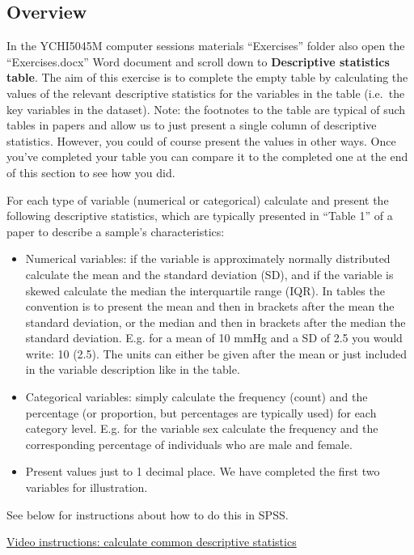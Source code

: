\documentclass[
]{book}
\begin{document}
\hypertarget{overview-9}{%
\subsection{Overview}\label{overview-9}}

In the YCHI5045M computer sessions materials ``Exercises'' folder also open the ``Exercises.docx'' Word document and scroll down to \textbf{Descriptive statistics table}. The aim of this exercise is to complete the empty table by calculating the values of the relevant descriptive statistics for the variables in the table (i.e.~the key variables in the dataset). Note: the footnotes to the table are typical of such tables in papers and allow us to just present a single column of descriptive statistics. However, you could of course present the values in other ways. Once you've completed your table you can compare it to the completed one at the end of this section to see how you did.

For each type of variable (numerical or categorical) calculate and present the following descriptive statistics, which are typically presented in ``Table 1'' of a paper to describe a sample's characteristics:

\begin{itemize}
\item
  Numerical variables: if the variable is approximately normally distributed calculate the mean and the standard deviation (SD), and if the variable is skewed calculate the median the interquartile range (IQR). In tables the convention is to present the mean and then in brackets after the mean the standard deviation, or the median and then in brackets after the median the standard deviation. E.g. for a mean of 10 mmHg and a SD of 2.5 you would write: 10 (2.5). The units can either be given after the mean or just included in the variable description like in the table.
\item
  Categorical variables: simply calculate the frequency (count) and the percentage (or proportion, but percentages are typically used) for each category level. E.g. for the variable sex calculate the frequency and the corresponding percentage of individuals who are male and female.
\item
  Present values just to 1 decimal place. We have completed the first two variables for illustration.
\end{itemize}

See below for instructions about how to do this in SPSS.

\href{https://youtu.be/uw0ukUUKg5o}{Video instructions: calculate common descriptive statistics}
\end{document}
